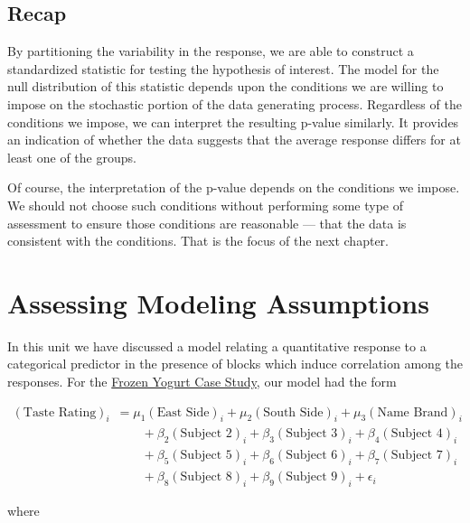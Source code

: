 \documentclass[
]{book}
\theoremstyle{plain}
\theoremstyle{mydefn}
\theoremstyle{myexmpl}
\theoremstyle{remark}
\begin{document}
\hypertarget{recap-4}{%
\section{Recap}\label{recap-4}}

By partitioning the variability in the response, we are able to construct a standardized statistic for testing the hypothesis of interest. The model for the null distribution of this statistic depends upon the conditions we are willing to impose on the stochastic portion of the data generating process. Regardless of the conditions we impose, we can interpret the resulting p-value similarly. It provides an indication of whether the data suggests that the average response differs for at least one of the groups.

Of course, the interpretation of the p-value depends on the conditions we impose. We should not choose such conditions without performing some type of assessment to ensure those conditions are reasonable --- that the data is consistent with the conditions. That is the focus of the next chapter.

\hypertarget{Blockassessment}{%
\chapter{Assessing Modeling Assumptions}\label{Blockassessment}}

In this unit we have discussed a model relating a quantitative response to a categorical predictor in the presence of blocks which induce correlation among the responses. For the \protect\hyperlink{CaseYogurt}{Frozen Yogurt Case Study}, our model had the form

\[
\begin{aligned}
  (\text{Taste Rating})_i &= \mu_1 (\text{East Side})_i + \mu_2 (\text{South Side})_i + \mu_3 (\text{Name Brand})_i \\
    &\qquad + \beta_2 (\text{Subject 2})_i + \beta_3 (\text{Subject 3})_i + \beta_4 (\text{Subject 4})_i \\
    &\qquad + \beta_5 (\text{Subject 5})_i + \beta_6 (\text{Subject 6})_i + \beta_7 (\text{Subject 7})_i \\
    &\qquad + \beta_8 (\text{Subject 8})_i + \beta_9 (\text{Subject 9})_i + \epsilon_i
\end{aligned}
\]

where
\end{document}
